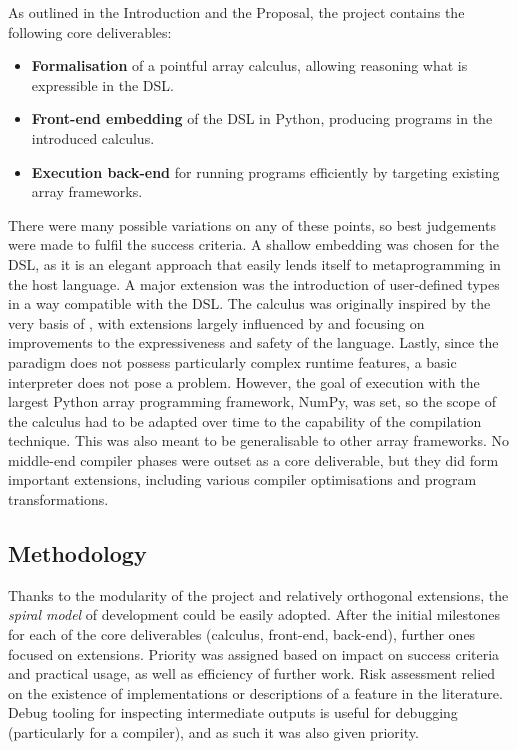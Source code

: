 As outlined in the Introduction and the Proposal, the project contains the following core deliverables:
\begin{itemize}
    \item \textbf{Formalisation} of a pointful array calculus, allowing reasoning what is expressible in the DSL.
    \item \textbf{Front-end embedding} of the DSL in Python, producing programs in the introduced calculus.
    \item \textbf{Execution back-end} for running programs efficiently by targeting existing array frameworks.
\end{itemize}
There were many possible variations on any of these points, so best judgements were made to fulfil the success criteria. A shallow embedding was chosen for the DSL, as it is an elegant approach that easily lends itself to metaprogramming in the host language. A major extension was the introduction of user-defined types in a way compatible with the DSL. The calculus was originally inspired by the very basis of \textcite{paszke2021getting}, with extensions largely influenced by \textcite{shaikhha2019efficient} and focusing on improvements to the expressiveness and safety of the language. Lastly, since the paradigm does not possess particularly complex runtime features, a basic interpreter does not pose a problem. However, the goal of execution with the largest Python array programming framework, NumPy, was set, so the scope of the calculus had to be adapted over time to the capability of the compilation technique. This was also meant to be generalisable to other array frameworks. No middle-end compiler phases were outset as a core deliverable, but they did form important extensions, including various compiler optimisations and program transformations.

\subsection{Methodology}

 Thanks to the modularity of the project and relatively orthogonal extensions, the \textit{spiral model} of development could be easily adopted. After the initial milestones for each of the core deliverables (calculus, front-end, back-end), further ones focused on extensions. Priority was assigned based on impact on success criteria and practical usage, as well as efficiency of further work. Risk assessment relied on the existence of implementations or descriptions of a feature in the literature. Debug tooling for inspecting intermediate outputs is useful for debugging (particularly for a compiler), and as such it was also given priority.


